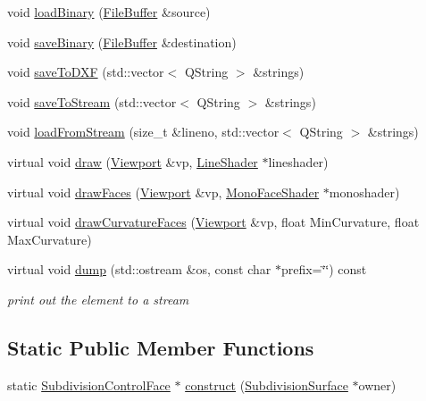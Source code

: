\begin{DoxyCompactItemize}
\item 
void \hyperlink{classShipCAD_1_1SubdivisionControlFace_aa5ba43707787cde6e99cd645708e9200}{load\-Binary} (\hyperlink{classShipCAD_1_1FileBuffer}{File\-Buffer} \&source)
\item 
void \hyperlink{classShipCAD_1_1SubdivisionControlFace_a562b877e868dbd86ffe2c864232e1b78}{save\-Binary} (\hyperlink{classShipCAD_1_1FileBuffer}{File\-Buffer} \&destination)
\item 
void \hyperlink{classShipCAD_1_1SubdivisionControlFace_ab2aaada5c28682e4f17bc47261203cee}{save\-To\-D\-X\-F} (std\-::vector$<$ Q\-String $>$ \&strings)
\item 
void \hyperlink{classShipCAD_1_1SubdivisionControlFace_aa75c77ee2e007015851930a604744aa0}{save\-To\-Stream} (std\-::vector$<$ Q\-String $>$ \&strings)
\item 
void \hyperlink{classShipCAD_1_1SubdivisionControlFace_ae856d93b8844854d908835df1f363ddd}{load\-From\-Stream} (size\-\_\-t \&lineno, std\-::vector$<$ Q\-String $>$ \&strings)
\item 
virtual void \hyperlink{classShipCAD_1_1SubdivisionControlFace_ac253493bccd91108d936b651e72b46f8}{draw} (\hyperlink{classShipCAD_1_1Viewport}{Viewport} \&vp, \hyperlink{classShipCAD_1_1LineShader}{Line\-Shader} $\ast$lineshader)
\item 
virtual void \hyperlink{classShipCAD_1_1SubdivisionControlFace_aef1327fd3e623b190d67dcb461a3e950}{draw\-Faces} (\hyperlink{classShipCAD_1_1Viewport}{Viewport} \&vp, \hyperlink{classShipCAD_1_1MonoFaceShader}{Mono\-Face\-Shader} $\ast$monoshader)
\item 
virtual void \hyperlink{classShipCAD_1_1SubdivisionControlFace_aaf9226150996743d8d2ea560083ad1d8}{draw\-Curvature\-Faces} (\hyperlink{classShipCAD_1_1Viewport}{Viewport} \&vp, float Min\-Curvature, float Max\-Curvature)
\item 
virtual void \hyperlink{classShipCAD_1_1SubdivisionControlFace_a947868fba3e9bb6c587847fb9245c9ff}{dump} (std\-::ostream \&os, const char $\ast$prefix=\char`\"{}\char`\"{}) const 
\begin{DoxyCompactList}\small\item\em print out the element to a stream \end{DoxyCompactList}\end{DoxyCompactItemize}
\subsection*{Static Public Member Functions}
\begin{DoxyCompactItemize}
\item 
static \hyperlink{classShipCAD_1_1SubdivisionControlFace}{Subdivision\-Control\-Face} $\ast$ \hyperlink{classShipCAD_1_1SubdivisionControlFace_a4117f55ab3ec27bebd933f2992bc5dcd}{construct} (\hyperlink{classShipCAD_1_1SubdivisionSurface}{Subdivision\-Surface} $\ast$owner)
\end{DoxyCompactItemize}
